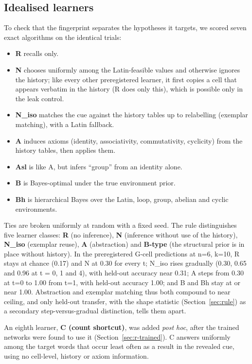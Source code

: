 \documentclass[11pt]{article}
\begin{document}
\subsection{Idealised learners}\label{sec:learners}

To check that the fingerprint separates the hypotheses it targets, we scored seven exact algorithms on the identical trials:

\begin{itemize}
  \item \textbf{R} recalls only.
  \item \textbf{N} chooses uniformly among the Latin-feasible values and otherwise ignores the history; like every other preregistered learner, it first copies a cell that appears verbatim in the history (R does only this), which is possible only in the leak control.
  \item \textbf{N\_iso} matches the cue against the history tables up to relabelling (exemplar matching), with a Latin fallback.
  \item \textbf{A} induces axioms (identity, associativity, commutativity, cyclicity) from the history tables, then applies them.
  \item \textbf{Asl} is like A, but infers ``group'' from an identity alone.
  \item \textbf{B} is Bayes-optimal under the true environment prior.
  \item \textbf{Bh} is hierarchical Bayes over the Latin, loop, group, abelian and cyclic environments.
\end{itemize}

Ties are broken uniformly at random with a fixed seed. The rule distinguishes five learner classes: \textbf{R} (no inference), \textbf{N} (inference without use of the history), \textbf{N\_iso} (exemplar reuse), \textbf{A} (abstraction) and \textbf{B-type} (the structural prior is in place without history). In the preregistered G-cell predictions at n=6, k=10, R stays at chance (0.17) and N at 0.30 for every t; N\_iso rises gradually (0.30, 0.65 and 0.96 at t = 0, 1 and 4), with held-out accuracy near 0.31; A steps from 0.30 at t=0 to 1.00 from t=1, with held-out accuracy 1.00; and B and Bh stay at or near 1.00. Abstraction and exemplar matching thus both compound to near ceiling, and only held-out transfer, with the shape statistic (Section~\ref{sec:rule}) as a secondary step-versus-gradual distinction, tells them apart.

An eighth learner, \textbf{C (count shortcut)}, was added \emph{post hoc}, after the trained networks were found to use it (Section~\ref{sec:r-trained}). C answers uniformly among the target words that occur least often as a result in the revealed cue, using no cell-level, history or axiom information.
\end{document}
